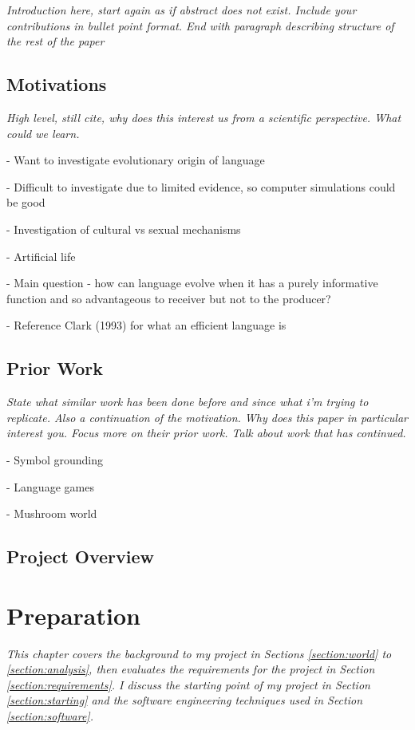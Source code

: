 \documentclass[12pt,a4paper,twoside,openright]{report}
\begin{document}
\emph{Introduction here, start again as if abstract does not exist. Include your contributions in bullet point format. End with paragraph describing structure of the rest of the paper}

\section{Motivations}

\emph{High level, still cite, why does this interest us from a scientific perspective. What could we learn.}

- Want to investigate evolutionary origin of language

- Difficult to investigate due to limited evidence, so computer simulations could be good

- Investigation of cultural vs sexual mechanisms

- Artificial life

- Main question - how can language evolve when it has a purely informative function and so advantageous to receiver but not to the producer?

- Reference Clark (1993) for what an efficient language is

\section{Prior Work}

\emph{State what similar work has been done before and since what i'm trying to replicate. Also a continuation of the motivation. Why does this paper in particular interest you. Focus more on their prior work. Talk about work that has continued.}

- Symbol grounding

- Language games

- Mushroom world

\section{Project Overview}


\chapter{Preparation}

\emph{This chapter covers the background to my project in Sections \ref{section:world} to \ref{section:analysis}, then evaluates the requirements for the project in Section \ref{section:requirements}. I discuss the starting point of my project in Section \ref{section:starting} and the software engineering techniques used in Section \ref{section:software}.}
\end{document}
